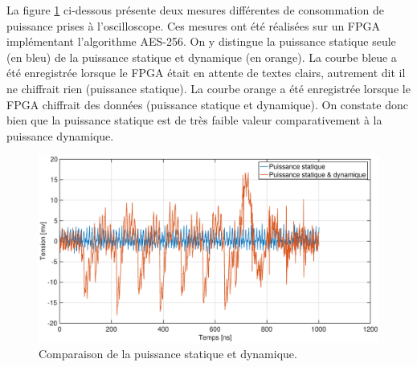 \documentclass[oneside]{book}
\begin{document}
La figure \ref{fig:static_dynamic} ci-dessous présente deux mesures différentes de consommation de puissance prises à l'oscilloscope. Ces mesures ont été réalisées sur un FPGA implémentant l'algorithme AES-256. On y distingue la puissance statique seule (en bleu) de la puissance statique et dynamique (en orange). La courbe bleue a été enregistrée lorsque le FPGA était en attente de textes clairs, autrement dit il ne chiffrait rien (\Rightarrow puissance statique). La courbe orange a été enregistrée lorsque le FPGA chiffrait des données (\Rightarrow puissance statique et dynamique). On constate donc bien que la puissance statique est de très faible valeur comparativement à la puissance dynamique.
\begin{figure}[htbp]
    \hspace{-1cm}
    \includegraphics[scale=0.34]{image/static_dynamic}
    \caption{Comparaison de la puissance statique et dynamique.}
    \label{fig:static_dynamic}
\end{figure}



\vspace{-0.3cm}
\end{document}
